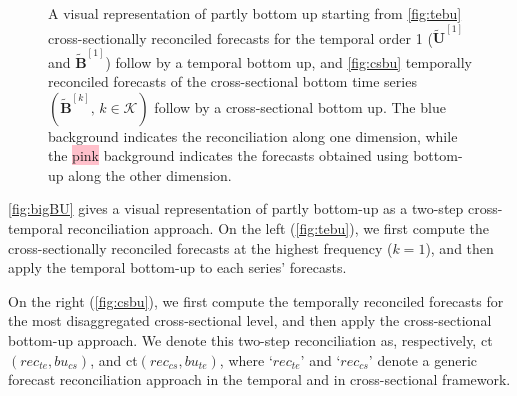 \documentclass[a4paper,11pt]{article}
\newcommand{\Bvet}{\bm{B}}
\newcommand{\Uvet}{\bm{U}}
\theoremstyle{definition}
\begin{document}
\begin{figure}[!b]
\begin{subfigure}[b]{0.49\textwidth}
{}
		\label{fig:csbu}
	\end{subfigure}
	\vspace{-1cm}
	\caption{A visual representation of partly bottom up starting from \eqref{fig:tebu} cross-sectionally reconciled forecasts for the temporal order 1 ($\widetilde{\Uvet}^{[1]}$ and $\widetilde{\Bvet}^{[1]}$) follow by a temporal bottom up, and \eqref{fig:csbu} temporally reconciled forecasts of the cross-sectional bottom time series $(\widetilde{\Bvet}^{[k]}, \, k\in \mathcal{K})$ follow by a cross-sectional bottom up. The \colorbox{mybluehl}{blue} background indicates the reconciliation along one dimension, while the \colorbox{pink}{pink} background indicates the forecasts obtained using bottom-up along the other dimension.}
	\label{fig:bigBU}
\end{figure}

\autoref{fig:bigBU} gives a visual representation of partly bottom-up as a two-step cross-temporal reconciliation approach. On the left (\autoref{fig:tebu}), we first compute the cross-sectionally reconciled forecasts at the highest frequency ($k = 1$), and then apply the temporal bottom-up to each series' forecasts.

On the right (\autoref{fig:csbu}), we first compute the temporally reconciled forecasts for the most disaggregated cross-sectional level, and then apply the cross-sectional bottom-up approach. We denote this two-step reconciliation as, respectively, ct$(rec_{te},bu_{cs})$, and ct$(rec_{cs},bu_{te})$, where ‘$rec_{te}$’ and ‘$rec_{cs}$’ denote a generic forecast reconciliation approach in the temporal and in cross-sectional framework.
\end{document}
